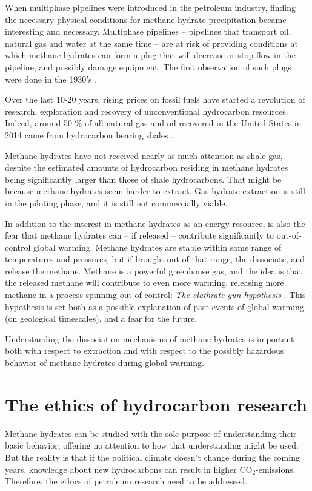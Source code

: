 When multiphase pipelines were introduced in the petroleum industry, finding the necessary physical conditions for methane hydrate precipitation became interesting and necessary. Multiphase pipelines -- pipelines that transport oil, natural gas and water at the same time -- are at risk of providing conditions at which methane hydrates can form a plug that will decrease or stop flow in the pipeline, and possibly damage equipment. The first observation of such plugs were done in the 1930's \cite{Hammerschmidt1934}.

Over the last 10-20 years, rising prices on fossil fuels have started a revolution of research, exploration and recovery of unconventional hydrocarbon resources. Indeed, around 50 \% of all natural gas and oil recovered in the United States in 2014 came from hydrocarbon bearing shales \cite{EIA2015}.

Methane hydrates have not received nearly as much attention as shale gas, despite the estimated amounts of hydrocarbon residing in methane hydrates being significantly larger than those of shale hydrocarbons. That might be because methane hydrates seem harder to extract. Gas hydrate extraction is still in the piloting phase, and it is still not commercially viable.

In addition to the interest in methane hydrates as an energy resource, is also the fear that methane hydrates can -- if released -- contribute significantly to out-of-control global warming. Methane hydrates are stable within some range of temperatures and pressures, but if brought out of that range, the dissociate, and release the methane. Methane is a powerful greenhouse gas, and the idea is that the released methane will contribute to even more warming, releasing more methane in a process spinning out of control: \emph{The clathrate gun hypothesis} \cite{kennett2003methane}. This hypothesis is set both as a possible explanation of past events of global warming (on geological timescales), and a fear for the future.

Understanding the dissociation mechanisms of methane hydrates is important both with respect to extraction and with respect to the possibly hazardous behavior of methane hydrates during global warming. 

\section{The ethics of hydrocarbon research}
Methane hydrates can be studied with the sole purpose of understanding their basic behavior, offering no attention to how that understanding might be used. But the reality is that if the political climate doesn't change during the coming years, knowledge about new hydrocarbons can result in higher CO$_2$-emissions. Therefore, the ethics of petroleum research need to be addressed.

